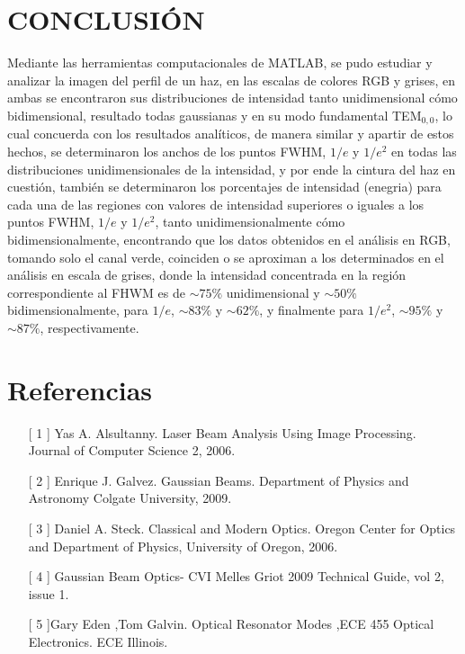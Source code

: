 \documentclass[11pt,letterpaper,twocolumn]{article}
\begin{document}
\section*{\normalsize{CONCLUSIÓN}}
Mediante las herramientas computacionales de MATLAB, se pudo estudiar y analizar la imagen del perfil de un haz, en las escalas de colores RGB y grises, en ambas se encontraron sus distribuciones de intensidad tanto unidimensional cómo bidimensional, resultado todas gaussianas y en su modo fundamental TEM$_{0,0}$, lo cual concuerda con los resultados analíticos, de manera similar y apartir de estos hechos, se determinaron los anchos de los puntos FWHM, $1/e$ y $1/e^{2}$ en todas las distribuciones unidimensionales de la intensidad, y por ende la cintura del haz en cuestión, también se determinaron los porcentajes de intensidad (enegria) para cada una de las regiones con valores de intensidad superiores o iguales a los puntos FWHM, $1/e$ y $1/e^{2}$, tanto unidimensionalmente cómo bidimensionalmente, encontrando que los datos obtenidos en el análisis en RGB, tomando solo el canal verde, coinciden o se aproximan a los determinados en el análisis en escala de grises, donde la intensidad concentrada en la región correspondiente al FHWM es de $\sim 75\%$ unidimensional y $\sim 50\%$ bidimensionalmente, para $1/e$, $\sim 83\%$ y $\sim 62\%$, y  finalmente para $1/e^{2}$, $\sim 95 \%$ y $\sim 87 \%$, respectivamente.  
\section*{Referencias} 
\begin{itemize} 
\item[[ 1]] Yas A. Alsultanny. Laser Beam Analysis Using Image Processing. Journal of Computer Science 2, 2006. 
\item[[ 2]] Enrique J. Galvez. Gaussian Beams. Department of Physics and Astronomy Colgate University, 2009.

\item[[ 3]] Daniel A. Steck. Classical and Modern Optics. Oregon Center for Optics and Department of Physics, University of Oregon, 2006.

\item[[ 4]] Gaussian Beam Optics- CVI Melles Griot 2009 Technical Guide, vol 2, issue 1.

\item[[ 5]]Gary Eden ,Tom Galvin. Optical Resonator Modes ,ECE 455 Optical Electronics. ECE Illinois. 
\end{itemize}
\end{document}
